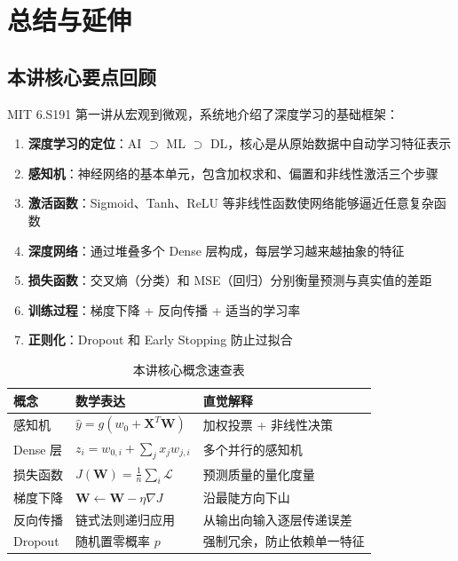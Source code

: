 \section{总结与延伸}

\subsection{本讲核心要点回顾}

MIT 6.S191 第一讲从宏观到微观，系统地介绍了深度学习的基础框架：

\begin{enumerate}
\item \textbf{深度学习的定位}：AI $\supset$ ML $\supset$ DL，核心是从原始数据中自动学习特征表示
\item \textbf{感知机}：神经网络的基本单元，包含加权求和、偏置和非线性激活三个步骤
\item \textbf{激活函数}：Sigmoid、Tanh、ReLU 等非线性函数使网络能够逼近任意复杂函数
\item \textbf{深度网络}：通过堆叠多个 Dense 层构成，每层学习越来越抽象的特征
\item \textbf{损失函数}：交叉熵（分类）和 MSE（回归）分别衡量预测与真实值的差距
\item \textbf{训练过程}：梯度下降 + 反向传播 + 适当的学习率
\item \textbf{正则化}：Dropout 和 Early Stopping 防止过拟合
\end{enumerate}

\begin{table}[H]
\centering
\begin{tabular}{lp{5cm}p{5cm}}
\toprule
\textbf{概念} & \textbf{数学表达} & \textbf{直觉解释} \\
\midrule
感知机 & $\hat{y} = g(w_0 + \mathbf{X}^T\mathbf{W})$ & 加权投票 + 非线性决策 \\
Dense 层 & $z_i = w_{0,i} + \sum_j x_j w_{j,i}$ & 多个并行的感知机 \\
损失函数 & $J(\mathbf{W}) = \frac{1}{n}\sum_i \mathcal{L}$ & 预测质量的量化度量 \\
梯度下降 & $\mathbf{W} \leftarrow \mathbf{W} - \eta \nabla J$ & 沿最陡方向下山 \\
反向传播 & 链式法则递归应用 & 从输出向输入逐层传递误差 \\
Dropout & 随机置零概率 $p$ & 强制冗余，防止依赖单一特征 \\
\bottomrule
\end{tabular}
\caption{本讲核心概念速查表}
\end{table}

